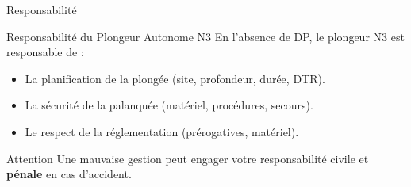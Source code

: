 \begin{frame}{Responsabilité}
    \begin{block}{Responsabilité du Plongeur Autonome N3}
        En l'absence de DP, le plongeur N3 est responsable de :
        \begin{itemize}
            \item La planification de la plongée (site, profondeur, durée, DTR).
            \item La sécurité de la palanquée (matériel, procédures, secours).
            \item Le respect de la réglementation (prérogatives, matériel).
        \end{itemize}
    \end{block}

    \begin{alertblock}{Attention}
        Une mauvaise gestion peut engager votre responsabilité civile et \textbf{pénale} en cas d'accident.
    \end{alertblock}
\end{frame}

